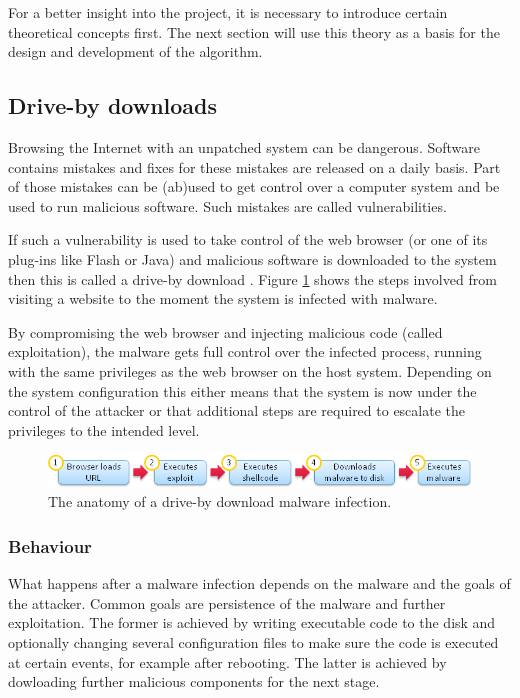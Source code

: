 For a better insight into the project, it is necessary to introduce certain theoretical concepts first. The next section will use this theory as a basis for the design and development of the algorithm.

\subsection{Drive-by downloads}

Browsing the Internet with an unpatched system can be dangerous. Software contains mistakes and fixes for these mistakes are released on a daily basis. Part of those mistakes can be (ab)used to get control over a computer system and be used to run malicious software. Such mistakes are called vulnerabilities.

If such a vulnerability is used to take control of the web browser (or one of its plug-ins like Flash or Java) and malicious software is downloaded to the system then this is called a drive-by download \cite{Le2013}. Figure \ref{fig:dbdownload} shows the steps involved from visiting a website to the moment the system is infected with malware.

By compromising the web browser and injecting malicious code (called exploitation), the malware gets full control over the infected process, running with the same privileges as the web browser on the host system. Depending on the system configuration this either means that the system is now under the control of the attacker or that additional steps are required to escalate the privileges to the intended level.

\begin{figure}[h]
    \centering
    \includegraphics[width=12cm]{Images/drive-by-download.png}
    \caption{The anatomy of a drive-by download malware infection. \cite{dbdownload-anatomy}}
    \label{fig:dbdownload}
\end{figure}
\vspace{-2mm}

\subsubsection{Behaviour}
\label{sec:behavior}

What happens after a malware infection depends on the malware and the goals of the attacker. Common goals are persistence of the malware and further exploitation. The former is achieved by writing executable code to the disk and optionally changing several configuration files to make sure the code is executed at certain events, for example after rebooting. The latter is achieved by dowloading further malicious components for the next stage. %

